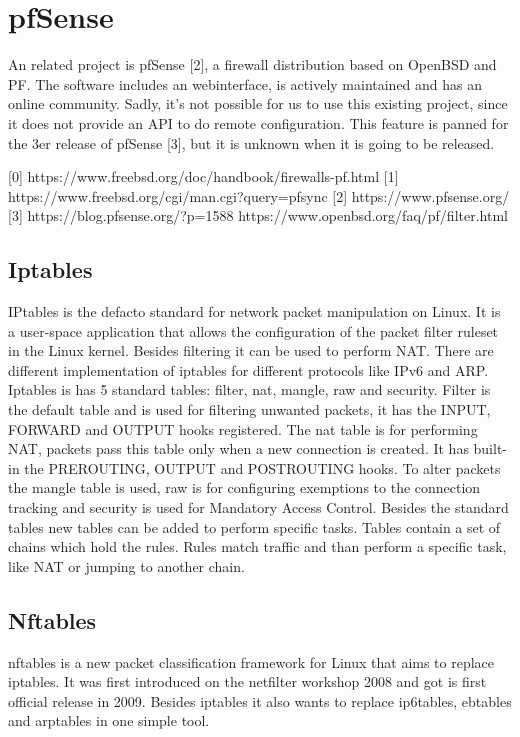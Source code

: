 \section{pfSense}\label{pfsense}

An related project is pfSense {[}2{]}, a firewall distribution based on
OpenBSD and PF. The software includes an webinterface, is actively
maintained and has an online community. Sadly, it's not possible for us
to use this existing project, since it does not provide an API to do
remote configuration. This feature is panned for the 3er release of
pfSense {[}3{]}, but it is unknown when it is going to be released.

{[}0{]} https://www.freebsd.org/doc/handbook/firewalls-pf.html {[}1{]}
https://www.freebsd.org/cgi/man.cgi?query=pfsync {[}2{]}
https://www.pfsense.org/ {[}3{]} https://blog.pfsense.org/?p=1588
https://www.openbsd.org/faq/pf/filter.html

\subsection{Iptables}\label{iptables}

IPtables is the defacto standard for network packet manipulation on
Linux. It is a user-space application that allows the configuration of
the packet filter ruleset in the Linux kernel. Besides filtering it can
be used to perform NAT. There are different implementation of iptables
for different protocols like IPv6 and ARP. Iptables is has 5 standard
tables: filter, nat, mangle, raw and security. Filter is the default
table and is used for filtering unwanted packets, it has the INPUT,
FORWARD and OUTPUT hooks registered. The nat table is for performing
NAT, packets pass this table only when a new connection is created. It
has built-in the PREROUTING, OUTPUT and POSTROUTING hooks. To alter
packets the mangle table is used, raw is for configuring exemptions to
the connection tracking and security is used for Mandatory Access
Control. Besides the standard tables new tables can be added to perform
specific tasks. Tables contain a set of chains which hold the rules.
Rules match traffic and than perform a specific task, like NAT or
jumping to another chain.

\subsection{Nftables}\label{nftables}

nftables is a new packet classification framework for Linux that aims to
replace iptables. It was first introduced on the netfilter workshop 2008
and got is first official release in 2009. Besides iptables it also
wants to replace ip6tables, ebtables and arptables in one simple tool.

